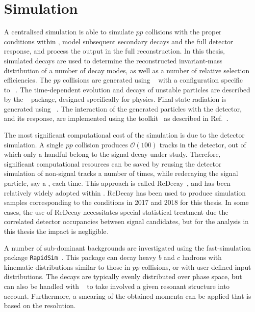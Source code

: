 



\section{Simulation} %
\label{sec:simulation}

A centralised \lhcb simulation is able to simulate $pp$ collisions with the proper conditions within \lhcb, model subsequent secondary decays and the full detector response, and process the output in the full \lhcb reconstruction. In this thesis, simulated decays are used to determine the reconstructed invariant-mass distribution of a number of decay modes, as well as a number of relative selection efficiencies. The $pp$ collisions are generated using \pythia~\cite{Sjostrand:2007gs,*Sjostrand:2006za} with a configuration specific to \lhcb~\cite{LHCb-PROC-2010-056}. The time-dependent evolution and decays of unstable particles are described by the \evtgen~\cite{EvtGen} package, designed specifically for \B physics. Final-state radiation is generated using \photos~\cite{Golonka:2005pn}. The interaction of the generated particles with the detector, and its response, are implemented using the \geant toolkit~\cite{Allison:2006ve, *Agostinelli:2002hh} as described in  Ref.~\cite{LHCb-PROC-2011-006}. 

The most significant computational cost of the simulation is due to the detector simulation. A single $pp$ collision produces $\mathcal O(100)$ tracks in the detector, out of which only a handful belong to the signal decay under study. Therefore, significant computational resources can be saved by reusing the detector simulation of non-signal tracks a number of times, while redecaying the signal particle, say a \Bp, each time. This approach is called ReDecay~\cite{LHCb-DP-2018-004}, and has been relatively widely adopted within \lhcb. ReDecay has been used to produce simulation samples corresponding to the conditions in 2017 and 2018 for this thesis. In some cases, the use of ReDecay necessitates special statistical treatment due the correlated detector occupancies between signal candidates, but for the analysis in this thesis the impact is negligible.

A number of sub-dominant backgrounds are investigated using the fast-simulation package \texttt{RapidSim}~\cite{cowanRapidSimApplicationFast2017}. This package can decay heavy $b$ and $c$ hadrons with kinematic distributions similar to those in \lhcb $pp$ collisions, or with user defined input distributions. The decays are typically evenly distributed over phase space, but can also be handled with \evtgen~\cite{EvtGen} to take involved a given resonant structure into account. Furthermore, a smearing of the obtained momenta can be applied that is based on the \lhcb resolution. 

